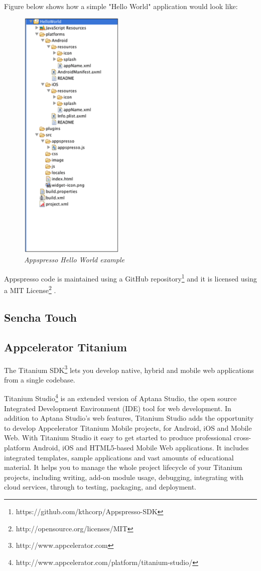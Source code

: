 \documentclass[a4paper,12pt]{book}
\begin{document}
Figure below shows how a simple "Hello World" application would look like:

\begin{figure}[H]
    \centering
    \includegraphics[width=5cm, keepaspectratio]{img/appspresso.png}
    \caption{\textit{Appspresso Hello World example}}
 \end{figure}
 
Appspresso code is maintained using a GitHub repository\footnote{https://github.com/kthcorp/Appspresso-SDK} and it is licensed using a MIT License\footnote{http://opensource.org/licenses/MIT} .
 
\subsection{Sencha Touch}
\label{Sencha Touch}


\subsection{Appcelerator Titanium}
\label{Appcelerator Titanium} 

The Titanium SDK\footnote{http://www.appcelerator.com} lets you develop native, hybrid and mobile web applications from a single codebase. 

Titanium Studio\footnote{http://www.appcelerator.com/platform/titanium-studio/} is an extended version of Aptana Studio, the open source Integrated Development Environment (IDE) tool for web development. In addition to Aptana Studio's web features, Titanium Studio adds the opportunity to develop Appcelerator Titanium Mobile projects, for Android, iOS and Mobile Web. With Titanium Studio it easy to get started to produce professional cross-platform Android, iOS and HTML5-based Mobile Web applications. It includes integrated templates, sample applications and vast amounts of educational material. It helps you to manage the whole project lifecycle of your Titanium projects, including writing, add-on module usage, debugging, integrating with cloud services, through to testing, packaging, and deployment.
\end{document}
